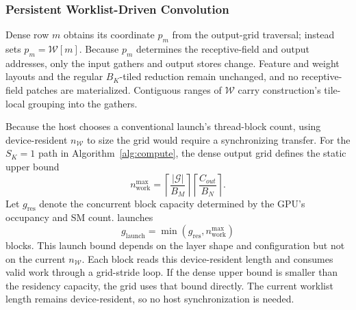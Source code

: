 \subsubsection{Persistent Worklist-Driven Convolution}
\label{sec:design:compute:persistent}

Dense row $m$ obtains its coordinate $p_m$ from the output-grid traversal;
\sysname instead sets $p_m=\mathcal{W}[m]$. Because $p_m$ determines the
receptive-field and output addresses, only the input gathers and output stores
change. Feature and weight layouts and the regular $B_K$-tiled reduction remain
unchanged, and no receptive-field patches are materialized. Contiguous ranges
of $\mathcal{W}$ carry construction's tile-local grouping into the gathers.

Because the host chooses a conventional launch's thread-block count, using
device-resident $n_{\mathcal{W}}$ to size the grid would require a synchronizing
transfer. For the $S_K=1$ path in Algorithm~\ref{alg:compute}, the dense output
grid defines the static upper bound
\begin{equation}
  n_{\mathrm{work}}^{\max}
  =
  \left\lceil \frac{|\mathcal{G}|}{B_M} \right\rceil
  \left\lceil \frac{C_{out}}{B_N} \right\rceil .
  \label{eq:n-work-max}
\end{equation}
Let $g_{\mathrm{res}}$ denote the concurrent block capacity determined by the
GPU's occupancy and SM count. \sysname launches
\begin{equation}
  g_{\mathrm{launch}}
  = \min\left(g_{\mathrm{res}},n_{\mathrm{work}}^{\max}\right)
  \label{eq:g-launch}
\end{equation}
blocks. This launch bound depends on the layer shape and configuration but not
on the current $n_{\mathcal{W}}$. Each block reads this device-resident length
and consumes valid work through a grid-stride loop. If the dense upper bound is
smaller than the residency capacity, the grid uses that bound directly. The
current worklist length remains device-resident, so no host synchronization is
needed.

